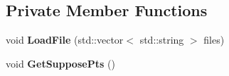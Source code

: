 \subsection*{Private Member Functions}
\begin{DoxyCompactItemize}
\item 
\hypertarget{classcamera__calibration_a461d87ecc98b610c880b6828ab56c345}{}void {\bfseries Load\+File} (std\+::vector$<$ std\+::string $>$ files)\label{classcamera__calibration_a461d87ecc98b610c880b6828ab56c345}

\item 
\hypertarget{classcamera__calibration_a5ba41d27411f27fd27d55f390eaf4318}{}void {\bfseries Get\+Suppose\+Pts} ()\label{classcamera__calibration_a5ba41d27411f27fd27d55f390eaf4318}

\end{DoxyCompactItemize}
